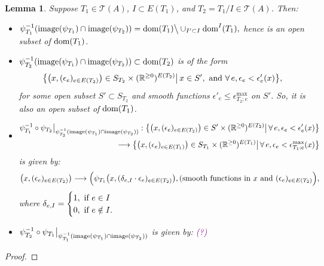 \documentclass[11pt]{article}
\newtheorem{lmm}[thm]{Lemma}
\theoremstyle{definition}
\theoremstyle{remark}
\def\R{\mathbb{R}}
\def\cT{\mathcal{T}}
\def\dom{{\tn{dom}}}
\def\cmt#1{\textcolor{purple}{(#1)}}
\def\tn#1{\textnormal{#1}}
\begin{document}
\begin{lmm}
Suppose $T_1\in\cT(A)$, $I\subset E(T_1)$, and $T_2=T_1/I\in \cT(A)$. Then:
\begin{itemize}
\item $\psi_{T_1}^{-1}(\tn{image}(\psi_{T_1})\cap\tn{image}(\psi_{T_2}))=\dom(T_1)\big\backslash\cup_{I'\subset I}\dom^I(T_1),$ hence is an open subset of $\dom(T_1)$. 
\item $\psi_{T_2}^{-1}(\tn{image}(\psi_{T_1})\cap\tn{image}(\psi_{T_2}))\subset\dom(T_2)$ is of the form 
$$\big\{\big(x,(\epsilon_e)_{e\in E(T_2)}\big)\in 
S_{T_2}\times(\R^{\ge0})^{E(T_2)}\big|\,x\in S',\tn{ and }\forall\,e, \epsilon_e<\epsilon'_e(x)\big\},$$
for some open subset $S'\subset S_{T_2}$ and smooth functions $\epsilon'_e\le \epsilon^{\max}_{T_2;e}$  on $S'$.
So, it is also an open subset of $\dom(T_1)$.  
\item 
\begin{align*}
\psi_{T_1}^{-1}\circ\psi_{T_2}\big|_{\psi_{T_2}^{-1}(\tn{image}(\psi_{T_1})\cap\tn{image}(\psi_{T_2}))}:
\big\{\big(x,(\epsilon_e)_{e\in E(T_2)}\big)\in S'\times(\R^{\ge0})^{E(T_2)}\big|\,\forall\,e, \epsilon_e<\epsilon'_e(x)\big\}\\
\longrightarrow
\big\{\big(x,(\epsilon_e)_{e\in E(T_1)}\big)\in S_{T_1}\times(\R^{\ge0})^{E(T_1)}\big|\,\forall\,e, \epsilon_e<\epsilon^{\max}_{T_1;e}(x)\big\}
\end{align*}
is given by: 
$$
\big(x,(\epsilon_e)_{e\in E(T_2)}\big)\longrightarrow \Big( 
\psi_{T_1}\big(x,(\delta_{e,I}\cdot\epsilon_e)_{e\in E(T_2)}\big), (\tn{smooth functions in }x\tn{ and }(\epsilon_e)_{e\in E(T_2)}
\Big), 
$$
where $\delta_{e,I}=\begin{cases}1, \tn{ if }e\in I\\ 0, \tn{ if }e\notin I.\end{cases}$

\item 
$\psi_{T_2}^{-1}\circ\psi_{T_1}\big|_{\psi_{T_1}^{-1}(\tn{image}(\psi_{T_1})\cap\tn{image}(\psi_{T_2}))}$
is given by: \cmt{?}
\end{itemize}
\end{lmm}

\begin{proof}

\end{proof}
\end{document}
